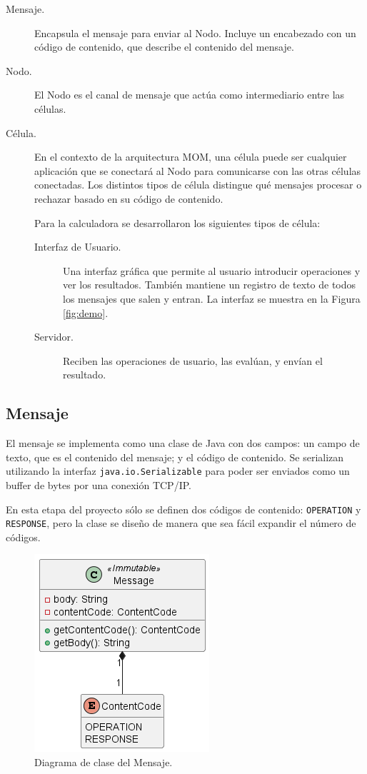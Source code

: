 \documentclass[conference,compsoc]{IEEEtran}
\begin{document}
\begin{description}
    \item[Mensaje.] Encapsula el mensaje para enviar al Nodo. Incluye un encabezado con un código de contenido, que describe el contenido del mensaje.
    \item[Nodo.] El Nodo es el canal de mensaje que actúa como intermediario entre las células.
    \item[Célula.] En el contexto de la arquitectura MOM, una célula puede ser cualquier aplicación que se conectará al Nodo para comunicarse con las otras células conectadas. Los distintos tipos de célula distingue qué mensajes procesar o rechazar basado en su código de contenido.
    
    Para la calculadora se desarrollaron los siguientes tipos de célula:
    \begin{description}
        \item[Interfaz de Usuario.] Una interfaz gráfica que permite al usuario introducir operaciones y ver los resultados. También mantiene un registro de texto de todos los mensajes que salen y entran. La interfaz se muestra en la Figura \ref{fig:demo}.
        \item[Servidor.] Reciben las operaciones de usuario, las evalúan, y envían el resultado.
    \end{description}
\end{description}

\subsection{Mensaje}

El mensaje se implementa como una clase de Java con dos campos: un campo de texto, que es el contenido del mensaje; y el código de contenido. Se serializan utilizando la interfaz \texttt{java.io.Serializable} para poder ser enviados como un buffer de bytes por una conexión TCP/IP.

En esta etapa del proyecto sólo se definen dos códigos de contenido: \texttt{OPERATION} y \texttt{RESPONSE}, pero la clase se diseño de manera que sea fácil expandir el número de códigos.

\begin{figure}[hbt]
    \centering
    \includegraphics[width=0.5\columnwidth]{message.png}
    \caption{Diagrama de clase del Mensaje.}
    \label{fig:message}
\end{figure}
\end{document}
